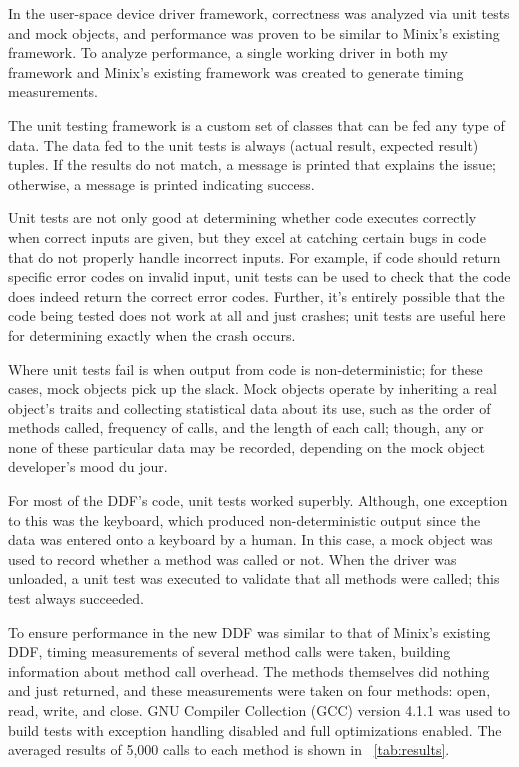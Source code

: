 
In the user-space device driver framework, correctness was analyzed via
unit tests and mock objects, and performance was proven to be similar
to Minix's existing framework.  To analyze performance, a single working
driver in both my framework and Minix's existing framework was created to
generate timing measurements.


The unit testing framework is a custom set of classes that can be fed any type
of data.  The data fed to the unit tests is always
{\important (actual result, expected result)} tuples.  If the results do
not match, a message is printed that explains the issue; otherwise, a message
is printed indicating success.

Unit tests are not only good at determining whether code executes correctly
when correct inputs are given, but they excel at catching certain bugs in code
that do not properly handle incorrect inputs.  For example, if code should
return specific error codes on invalid input, unit tests can be used to check
that the code does indeed return the correct error codes.  Further, it's
entirely possible that the code being tested does not work at all and just
crashes; unit tests are useful here for determining exactly when the
crash occurs.

Where unit tests fail is when output from code is non-deterministic; for these
cases, mock objects pick up the slack.  Mock objects operate by inheriting a
real object's traits and collecting statistical data about its use, such as
the order of methods called, frequency of calls, and the length of each call;
though, any or none of these particular data may be recorded, depending
on the mock object developer's mood du jour.

For most of the DDF's code, unit tests worked superbly.  Although, one
exception to this was the keyboard, which produced non-deterministic output
since the data was entered onto a keyboard by a human.  In this case, a mock
object was used to record whether a method was called or not.  When the driver
was unloaded, a unit test was executed to validate that all methods were
called; this test always succeeded.


To ensure performance in the new DDF was similar to that of Minix's existing
DDF, timing measurements of several method calls were taken,
building information about method call overhead.  The methods themselves
did nothing and just returned, and these measurements were taken on four
methods: {\important open, read, write}, and {\important close}.  GNU
Compiler Collection (GCC) version 4.1.1 was used to build tests with exception
handling disabled and full optimizations enabled.  The averaged results of
5,000 calls to each method is shown in \tablename~\ref{tab:results}.

